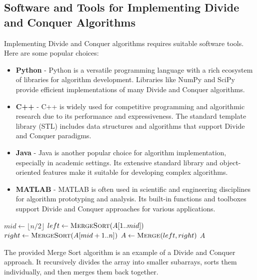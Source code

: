 \documentclass[12pt]{book} %
\begin{document}
\subsection{Software and Tools for Implementing Divide and Conquer Algorithms}
Implementing Divide and Conquer algorithms requires suitable software tools. Here are some popular choices:

\begin{itemize}
    \item \textbf{Python} - Python is a versatile programming language with a rich ecosystem of libraries for algorithm development. Libraries like NumPy and SciPy provide efficient implementations of many Divide and Conquer algorithms.
    
    \item \textbf{C++} - C++ is widely used for competitive programming and algorithmic research due to its performance and expressiveness. The standard template library (STL) includes data structures and algorithms that support Divide and Conquer paradigms.
    
    \item \textbf{Java} - Java is another popular choice for algorithm implementation, especially in academic settings. Its extensive standard library and object-oriented features make it suitable for developing complex algorithms.
    
    \item \textbf{MATLAB} - MATLAB is often used in scientific and engineering disciplines for algorithm prototyping and analysis. Its built-in functions and toolboxes support Divide and Conquer approaches for various applications.
\end{itemize}

\FloatBarrier
\begin{algorithm}
\caption{Merge Sort Algorithm}
\begin{algorithmic}[1]
        \State $mid \gets \lfloor n/2 \rfloor$
        \State $left \gets \Call{MergeSort}{A[1..mid]}$
        \State $right \gets \Call{MergeSort}{A[mid+1..n]}$
        \State $A \gets \Call{Merge}{left, right}$
    \EndIf
    \State \Return $A$
\EndFunction
\end{algorithmic}
\end{algorithm}
\FloatBarrier

The provided Merge Sort algorithm is an example of a Divide and Conquer approach. It recursively divides the array into smaller subarrays, sorts them individually, and then merges them back together.
\end{document}
